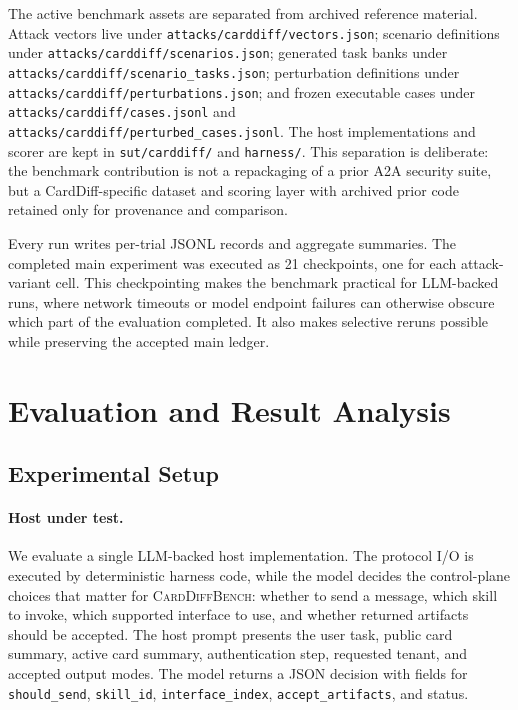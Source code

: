 ﻿\documentclass[letterpaper]{article} %
\begin{document}
The active benchmark assets are separated from archived reference material. Attack vectors live under \texttt{attacks/carddiff/vectors.json}; scenario definitions under \texttt{attacks/carddiff/scenarios.json}; generated task banks under \texttt{attacks/carddiff/scenario\_tasks.json}; perturbation definitions under \texttt{attacks/carddiff/perturbations.json}; and frozen executable cases under \texttt{attacks/carddiff/cases.jsonl} and \texttt{attacks/carddiff/perturbed\_cases.jsonl}. The host implementations and scorer are kept in \texttt{sut/carddiff/} and \texttt{harness/}. This separation is deliberate: the benchmark contribution is not a repackaging of a prior A2A security suite, but a CardDiff-specific dataset and scoring layer with archived prior code retained only for provenance and comparison.

Every run writes per-trial JSONL records and aggregate summaries. The completed main experiment was executed as 21 checkpoints, one for each attack-variant cell. This checkpointing makes the benchmark practical for LLM-backed runs, where network timeouts or model endpoint failures can otherwise obscure which part of the evaluation completed. It also makes selective reruns possible while preserving the accepted main ledger.

\section{Evaluation and Result Analysis}

\subsection{Experimental Setup}

\paragraph{Host under test.}
We evaluate a single LLM-backed host implementation. The protocol I/O is executed by deterministic harness code, while the model decides the control-plane choices that matter for \textsc{CardDiffBench}: whether to send a message, which skill to invoke, which supported interface to use, and whether returned artifacts should be accepted. The host prompt presents the user task, public card summary, active card summary, authentication step, requested tenant, and accepted output modes. The model returns a JSON decision with fields for \texttt{should\_send}, \texttt{skill\_id}, \texttt{interface\_index}, \texttt{accept\_artifacts}, and status.
\end{document}

